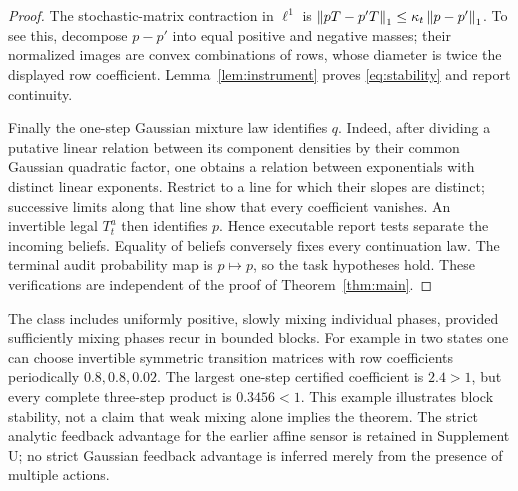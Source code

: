 \begin{proof}
The stochastic-matrix contraction in $\ell^1$ is $\left\lVert pT-p'T\right\rVert_1\le\kappa_t\left\lVert p-p'\right\rVert_1$. To see this, decompose $p-p'$ into equal positive and negative masses; their normalized images are convex combinations of rows, whose diameter is twice the displayed row coefficient. Lemma~\ref{lem:instrument} proves \eqref{eq:stability} and report continuity.

Finally the one-step Gaussian mixture law identifies $q$. Indeed, after dividing a putative linear relation between its component densities by their common Gaussian quadratic factor, one obtains a relation between exponentials with distinct linear exponents. Restrict to a line for which their slopes are distinct; successive limits along that line show that every coefficient vanishes. An invertible legal $T_t^a$ then identifies $p$. Hence executable report tests separate the incoming beliefs. Equality of beliefs conversely fixes every continuation law. The terminal audit probability map is $p\mapsto p$, so the task hypotheses hold. These verifications are independent of the proof of Theorem~\ref{thm:main}.
\end{proof}

The class includes uniformly positive, slowly mixing individual phases, provided sufficiently mixing phases recur in bounded blocks. For example in two states one can choose invertible symmetric transition matrices with row coefficients periodically $0.8,0.8,0.02$. The largest one-step certified coefficient is $2.4>1$, but every complete three-step product is $0.3456<1$. This example illustrates block stability, not a claim that weak mixing alone implies the theorem. The strict analytic feedback advantage for the earlier affine sensor is retained in Supplement U; no strict Gaussian feedback advantage is inferred merely from the presence of multiple actions.

